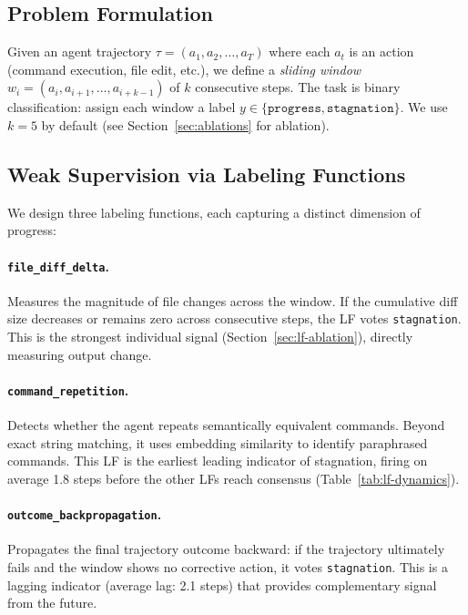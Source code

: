 \documentclass[11pt,a4paper]{article}
\begin{document}
\subsection{Problem Formulation}

Given an agent trajectory $\tau = (a_1, a_2, \ldots, a_T)$ where each $a_t$ is an action (command execution, file edit, etc.), we define a \emph{sliding window} $w_i = (a_i, a_{i+1}, \ldots, a_{i+k-1})$ of $k$ consecutive steps.
The task is binary classification: assign each window a label $y \in \{\texttt{progress}, \texttt{stagnation}\}$.
We use $k=5$ by default (see Section~\ref{sec:ablations} for ablation).

\subsection{Weak Supervision via Labeling Functions}
\label{sec:lfs}

We design three labeling functions, each capturing a distinct dimension of progress:

\paragraph{\texttt{file\_diff\_delta}.}
Measures the magnitude of file changes across the window.
If the cumulative diff size decreases or remains zero across consecutive steps, the LF votes \texttt{stagnation}.
This is the strongest individual signal (Section~\ref{sec:lf-ablation}), directly measuring output change.

\paragraph{\texttt{command\_repetition}.}
Detects whether the agent repeats semantically equivalent commands.
Beyond exact string matching, it uses embedding similarity to identify paraphrased commands.
This LF is the earliest leading indicator of stagnation, firing on average 1.8 steps before the other LFs reach consensus (Table~\ref{tab:lf-dynamics}).

\paragraph{\texttt{outcome\_backpropagation}.}
Propagates the final trajectory outcome backward: if the trajectory ultimately fails and the window shows no corrective action, it votes \texttt{stagnation}.
This is a lagging indicator (average lag: 2.1 steps) that provides complementary signal from the future.
\end{document}
